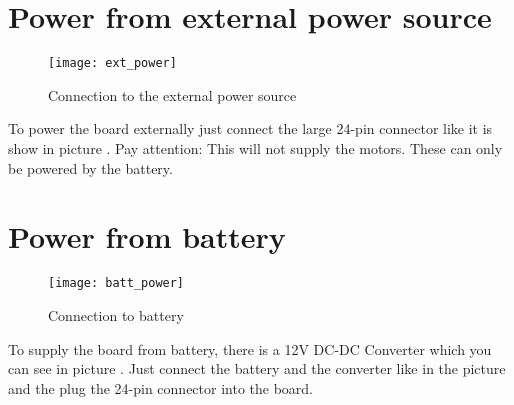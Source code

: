 \newpage

\section{Power from external power source}
\label{setup_external}

\begin{figure}[h]
	\centering
		\texttt{[image: ext\_power]}
	\caption{Connection to the external power source}
	\label{fig:ext_power}
\end{figure}
To power the board externally just connect the large 24-pin connector like it is show in picture . Pay attention: This will not supply the motors. These can only be powered by the battery.

\section{Power from battery}
\label{setup_battery}

\begin{figure}[h]
	\centering
		\texttt{[image: batt\_power]}
	\caption{Connection to battery}
	\label{fig:batt_power}
\end{figure}
To supply the board from battery, there is a 12V DC-DC Converter which you can see in picture . Just connect the battery and the converter like in the picture and the plug the 24-pin connector into the board.



